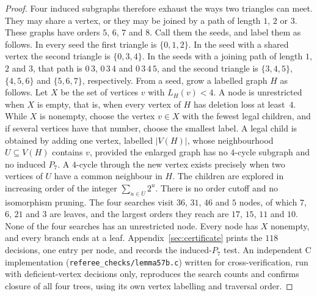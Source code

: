 \documentclass[ASNA]{USG}
\theoremstyle{WBstyletwo}
\numberwithin{equation}{section}
\begin{document}
\begin{proof}
Four induced subgraphs therefore exhaust the ways two triangles can meet. They may share a vertex, or they may be joined by a path of length $1$, $2$ or $3$. These graphs have orders $5$, $6$, $7$ and $8$. Call them the seeds, and label them as follows. In every seed the first triangle is $\{0,1,2\}$. In the seed with a shared vertex the second triangle is $\{0,3,4\}$. In the seeds with a joining path of length $1$, $2$ and $3$, that path is $0\,3$, $0\,3\,4$ and $0\,3\,4\,5$, and the second triangle is $\{3,4,5\}$, $\{4,5,6\}$ and $\{5,6,7\}$, respectively. From a seed, grow a labelled graph $H$ as follows. Let $X$ be the set of vertices $v$ with $L_H(v)<4$. A node is unrestricted when $X$ is empty, that is, when every vertex of $H$ has deletion loss at least~$4$. While $X$ is nonempty, choose the vertex $v\in X$ with the fewest legal children, and if several vertices have that number, choose the smallest label. A legal child is obtained by adding one vertex, labelled $|V(H)|$, whose neighbourhood $U\subseteq V(H)$ contains $v$, provided the enlarged graph has no $4$-cycle subgraph and no induced $P_7$. A $4$-cycle through the new vertex exists precisely when two vertices of $U$ have a common neighbour in $H$. The children are explored in increasing order of the integer $\sum_{u\in U}2^u$. There is no order cutoff and no isomorphism pruning. The four searches visit $36$, $31$, $46$ and $5$ nodes, of which $7$, $6$, $21$ and $3$ are leaves, and the largest orders they reach are $17$, $15$, $11$ and $10$. None of the four searches has an unrestricted node. Every node has $X$ nonempty, and every branch ends at a leaf. Appendix~\ref{sec:certificate} prints the $118$ decisions, one entry per node, and records the induced-$P_7$ test. An independent C implementation (\texttt{referee\_checks/lemma57b.c}) written for cross-verification, run with deficient-vertex decisions only, reproduces the search counts and confirms closure of all four trees, using its own vertex labelling and traversal order.


\end{proof}
\end{document}
